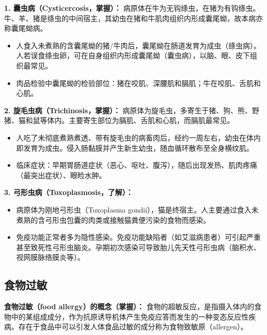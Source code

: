 \begin{keybox}
\textbf{1. 囊虫病（Cysticercosis，掌握）：}
病原体在牛为无钩绦虫，在猪为有钩绦虫。牛、羊、猪是绦虫的中间宿主，其幼虫在猪和牛肌肉组织内形成囊尾蚴，故本病亦称囊尾蚴病。
\begin{itemize}[leftmargin=*]
    \item 人食入未煮熟的含囊尾蚴的猪/牛肉后，囊尾蚴在肠道发育为成虫（绦虫病）。人若误食绦虫卵，可在自身组织内形成囊尾蚴（囊虫病），以脑、眼、皮下组织最常见。
    \item 肉品检验中囊尾蚴的检验部位：猪在咬肌、深腰肌和膈肌；牛在咬肌、舌肌和心肌。
\end{itemize}

\textbf{2. 旋毛虫病（Trichinosis，掌握）：}
病原体为旋毛虫，多寄生于猪、狗、熊、野猪、猫和鼠等体内。主要寄生部位为膈肌、舌肌和心肌，而膈肌最常见。
\begin{itemize}[leftmargin=*]
    \item 人吃了未彻底煮熟煮透、带有旋毛虫的病畜肉后，经约一周左右，幼虫在体内即发育为成虫。侵入肠黏膜并产生新生幼虫，随血循环散布至全身横纹肌。
    \item 临床症状：早期胃肠道症状（恶心、呕吐、腹泻），随后出现发热、肌肉疼痛（最突出症状）、眼睑水肿。
\end{itemize}

\textbf{3. 弓形虫病（Toxoplasmosis，了解）：}
\begin{itemize}[leftmargin=*]
    \item 病原体为刚地弓形虫（Toxoplasma gondii），猫是终宿主。人主要通过食入未煮熟的含弓形虫包囊的肉类或接触猫粪便污染的食物而感染。
    \item 免疫功能正常者多为隐性感染。免疫功能缺陷者（如艾滋病患者）可引起严重甚至致死性弓形虫脑炎。孕期初次感染可导致胎儿先天性弓形虫病（脑积水、视网膜脉络膜炎等）。
\end{itemize}
\end{keybox}

\subsection{食物过敏}

\begin{keybox}
\textbf{食物过敏（food allergy）的概念（掌握）：}
食物的超敏反应，是指摄入体内的食物中的某组成成分，作为抗原诱导机体产生免疫应答而发生的一种变态反应性疾病。存在于食品中可以引发人体食品过敏的成分称为食物致敏原（allergen）。
\end{keybox}

